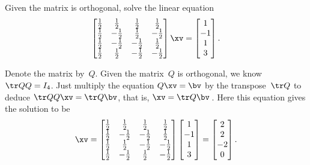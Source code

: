 \begin{example} 
Given the matrix is orthogonal, solve the linear equation
\begin{equation*}
\begin{bmatrix} 
  \frac12&\frac12&\frac12&\frac12
\\\frac12&-\frac12&\frac12&-\frac12
\\\frac12&-\frac12&-\frac12&\frac12
\\\frac12&\frac12&-\frac12&-\frac12 \end{bmatrix}\xv
=\begin{bmatrix} 1\\-1\\1\\3 \end{bmatrix}.
\end{equation*}
\begin{solution} 
Denote the matrix by~\(Q\).
Given the matrix~\(Q\) is orthogonal, we know \(\tr QQ=I_4\). 
Just multiply the equation \(Q\xv=\bv\) by the transpose~\(\tr Q\) to deduce \(\tr QQ\xv=\tr Q\bv\), that is, \(\xv=\tr Q\bv\)\,.  
Here this equation gives the solution to be
\begin{equation*}
\xv=\begin{bmatrix} 
  \frac12&\frac12&\frac12&\frac12
\\\frac12&-\frac12&-\frac12&\frac12
\\\frac12&\frac12&-\frac12&-\frac12
\\\frac12&-\frac12&\frac12&-\frac12 \end{bmatrix}
\begin{bmatrix} 1\\-1\\1\\3 \end{bmatrix}
=\begin{bmatrix} 2\\2\\-2\\0 \end{bmatrix}.
\end{equation*}
\end{solution}
\end{example}


